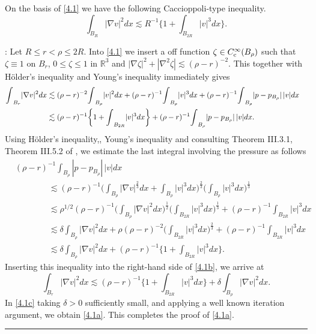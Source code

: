 \documentclass[12pt]{article}
\numberwithin{equation}{section}
\theoremstyle{definition}
\begin{document}
On the basis of \eqref{4.1} we have the following Caccioppoli-type inequality. 
\begin{equation}
{\int\limits}_{B_R} | \nabla {v} | ^2 dx  
 \lesssim  R^{ -1} \bigg\{1+ {\int\limits}_{B_{ 2R}} | {v} |^3 dx\bigg\}.
\label{4.1a}
\end{equation}
  
: Let $ R \le  r < \rho \le 2R$. Into \eqref{4.1} we insert a off function $ \zeta \in C^{\infty}_{\rm c}(B_\rho )$ such that $ \zeta \equiv 1$ on $ B_r$, $ 0 \le \zeta \le 1$ in $ {\mathbb{R}}^{3}$ and $ | \nabla \zeta| ^2+ | \nabla ^2\zeta |
  \lesssim  (\rho -r)^{ -2}$.  This together with H\"older's inequality and Young's inequality immediately gives \begin{align}
 {\int\limits}_{B_r} | \nabla {v} | ^2  dx &\lesssim  (\rho -r)^{ -2} {\int\limits}_{B_{\rho }} | {v} |^2dx  +   (\rho -r)^{ -1} {\int\limits}_{B_{ \rho }} | {v} |^3 dx
 + (\rho -r)^{ -1} {\int\limits}_{B_\rho }   | p- p_{ B_{ \rho }}| \, | {v} |  dx
  \cr
   &\lesssim  (\rho -r)^{ -1} \bigg\{1+{\int\limits}_{B_{ 2R} } | {v} |^3dx \bigg\}+ (\rho -r)^{ -1} {\int\limits}_{B_\rho }   | p- p_{ B_{ \rho }}| \, | {v} | dx. 
  \label{4.1b}
  \end{align}
Using H\"older's inequality,, Young's inequality and consulting  Theorem III.3.1, Theorem III.5.2 of \cite{Galdi}, we estimate the last integral involving the pressure as follows
\begin{align*}
& (\rho -r)^{ -1}{\int\limits}_{B_\rho } 
 | p- p_{ B_\rho }|\, | {v}|   dx
 \\
 &\qquad \qquad \lesssim  (\rho -r)^{ -1}  
 \bigg({\int\limits}_{B_\rho }  | \nabla {v}|^{ \frac23} dx+ {\int\limits}_{B_\rho }| {v} |^3 dx\bigg)^{ \frac23}
  \bigg({\int\limits}_{B_\rho } | {v} |^3 dx \bigg)^{ \frac13}
\\
 &\qquad \qquad \lesssim  \rho ^{ 1/2}(\rho -r)^{ -1}  \bigg({\int\limits}_{B_\rho } | \nabla {v} |^2 dx \bigg)^{ \frac12}
 \bigg({\int\limits}_{B_{ 2R}} | {v} |^3dx\bigg)^{ \frac13}
 + (\rho -r)^{ -1} {\int\limits}_{B_{ 2R} } | {v} |^3 dx
\\
 &\qquad \qquad \lesssim  \delta {\int\limits}_{B_\rho } | \nabla {v} |^2 dx + \rho (\rho -r)^{ -2} \bigg( {\int\limits}_{B_{ 2R} } | {v} |^3dx\bigg)^{ \frac23}
 + (\rho -r)^{ -1} {\int\limits}_{B_{ 2R} } | {v} |^3 dx
\\
 &\qquad \qquad \lesssim  \delta {\int\limits}_{B_\rho } | \nabla {v} |^2 dx
 + (\rho -r)^{ -1} \bigg\{1+{\int\limits}_{B_{ 2R} } | {v} |^3dx\bigg\}.
  \end{align*}
Inserting this inequality into the right-hand side of \eqref{4.1b}, we arrive at 
 \begin{equation}
{\int\limits}_{B_r} | \nabla {v} | ^2  dx  \lesssim  (\rho -r)^{ -1} \bigg\{1+ {\int\limits}_{B_{ 2R}} | {v} |^3 dx\bigg\}
+ \delta {\int\limits}_{B_\rho } | \nabla {v} | ^2 dx.
\label{4.1c}
\end{equation}
In \eqref{4.1c} taking $ \delta >0$ sufficiently small, and applying a well known iteration argument, we obtain \eqref{4.1a}.  
This completes the proof of  \eqref{4.1a}.  \hfill {\rule{0.2cm}{0.2cm}} \\
\end{document}
